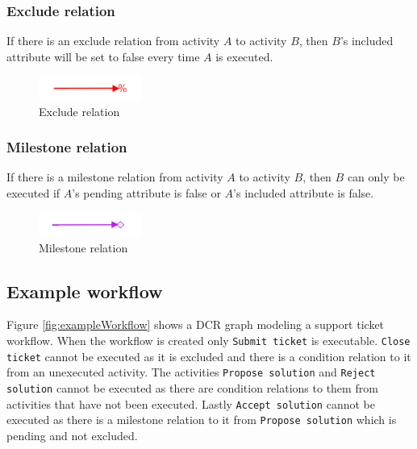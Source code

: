 \documentclass{article}
\begin{document}
			\subsubsection{Exclude relation}
			If there is an exclude relation from activity $A$ to activity $B$, then $B$'s included attribute will be set to false every time $A$ is executed.
			\begin{figure}[!ht]
				\centering
				\includegraphics[width=0.3\textwidth]{figures/ExcludeRelation.png}
			 	\caption[Exclude relation]
			 	{Exclude relation}
			\end{figure}

			\subsubsection{Milestone relation}
			If there is a milestone relation from activity $A$ to activity $B$, then $B$ can only be executed if $A$'s pending attribute is false or $A$'s included attribute is false.
			\begin{figure}[!ht]
				\centering
				\includegraphics[width=0.3\textwidth]{figures/MilestoneRelation.png}
			 	\caption[Milestone relation]
			 	{Milestone relation}
			\end{figure}		

		\subsection{Example workflow}
		Figure \ref{fig:exampleWorkflow} shows a DCR graph modeling a support ticket workflow. When the workflow is created only \texttt{Submit ticket} is executable. 
		\texttt{Close ticket} cannot be executed as it is excluded and there is a condition relation to it from an unexecuted activity.
		The activities \texttt{Propose solution} and \texttt{Reject solution} cannot be executed as there are condition relations to them from activities that have not been executed. 
		Lastly \texttt{Accept solution} cannot be executed as there is a milestone relation to it from \texttt{Propose solution} which is pending and not excluded.
\end{document}
